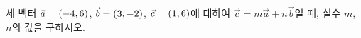 세 벡터 $\vec{a}=(-4{,}\mkern3mu\mathopen{}6)$, $\vec{b}=(3{,}\mkern3mu\mathopen{}-2)$, $\vec{c}=(1{,}\mkern3mu\mathopen{}6)$에 대하여 $\vec{c}=m\vec{a}+n\vec{b}$일 때, 실수 $m$, $n$의 값을 구하시오.
